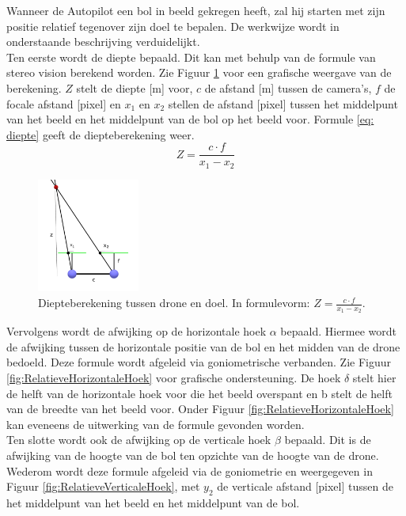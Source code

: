 \noindent
Wanneer de Autopilot een bol in beeld gekregen heeft, zal hij starten met zijn positie relatief tegenover zijn doel te bepalen. De werkwijze wordt in onderstaande beschrijving verduidelijkt.
\\
Ten eerste wordt de diepte bepaald. Dit kan met behulp van de formule van stereo vision \cite{website:techbriefs} berekend worden.
Zie Figuur \ref{fig:DiepteberekeningDroneEnDoel} voor een grafische weergave van de berekening. \(Z\) stelt de diepte [m] voor, \(c\) de afstand [m] tussen de camera's, \(f\) de focale afstand [pixel] en $x_1$ en $x_2$ stellen de afstand [pixel] tussen het middelpunt van het beeld en het middelpunt van de bol op het beeld voor. Formule \ref{eq: diepte} geeft de diepteberekening weer.
\begin{equation} \label{eq: diepte}
Z = \frac{c \cdot f}{x_1 - x_2}
\end{equation}
\begin{figure}[H]
	\centering
	\includegraphics[width=0.3\textwidth]{DiepteberekeningDroneEnDoel.png}
	\caption{Diepteberekening tussen drone en doel. In formulevorm: \(Z = \frac{c \cdot f}{x_1 - x_2}\).}
	\label{fig:DiepteberekeningDroneEnDoel}
\end{figure}
\noindent Vervolgens wordt de afwijking op de horizontale hoek $\alpha$ bepaald. Hiermee wordt de afwijking tussen de horizontale positie van de bol en het midden van de drone bedoeld. Deze formule wordt afgeleid via goniometrische verbanden. Zie Figuur \ref{fig:RelatieveHorizontaleHoek} voor grafische ondersteuning. De hoek $\delta$ stelt hier de helft van de horizontale hoek voor die het beeld overspant en b stelt de helft van de breedte van het beeld voor. Onder Figuur \ref{fig:RelatieveHorizontaleHoek} kan eveneens de uitwerking van de formule gevonden worden.
\\
Ten slotte wordt ook de afwijking op de verticale hoek $\beta$ bepaald. Dit is de afwijking van de hoogte van de bol ten opzichte van de hoogte van de drone. Wederom wordt deze formule afgeleid via de goniometrie en weergegeven in Figuur \ref{fig:RelatieveVerticaleHoek}, met $y_2$ de verticale afstand [pixel] tussen de het middelpunt van het beeld en het middelpunt van de bol.
